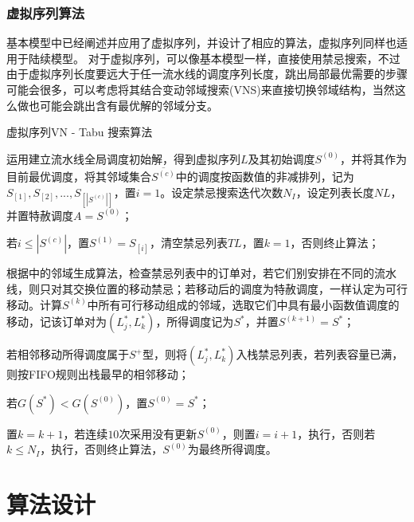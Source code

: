 \subsubsection{虚拟序列算法}
基本模型中已经阐述并应用了虚拟序列，并设计了相应的算法，虚拟序列同样也适用于陆续模型。
对于虚拟序列，可以像基本模型一样，直接使用禁忌搜索，不过由于虚拟序列长度要远大于任一流水线的调度序列长度，跳出局部最优需要的步骤可能会很多，可以考虑将其结合变动邻域搜索(VNS)来直接切换邻域结构，当然这么做也可能会跳出含有最优解的邻域分支。
\begin{algori}
虚拟序列VN - Tabu 搜索算法
\begin{asparaenum}
\renewcommand{\labelenumi}{\bf Step\theenumi~}
\item 运用建立流水线全局调度初始解，得到虚拟序列$L$及其初始调度$S^{(0)}$，并将其作为目前最优调度，将其邻域集合$\overline{S^{(c)}}$中的调度按函数值的非减排列，记为$S_{[1]},S_{[2]},...,S_{[|S^{(c)}|]}$，置$i = 1$。设定禁忌搜索迭代次数$N_I$，设定列表长度$NL$，并置特赦调度$A = S^{(0)}$；
\item 若$i \le |S^{(c)}|$，置$S^{(1)} = S_{[i]}$，清空禁忌列表$TL$，置$k = 1$，否则终止算法；
\item 根据中的邻域生成算法，检查禁忌列表中的订单对，若它们别安排在不同的流水线，则只对其交换位置的移动禁忌；若移动后的调度为特赦调度，一样认定为可行移动。计算$S^{(k)}$中所有可行移动组成的邻域，选取它们中具有最小函数值调度的移动，记该订单对为$(L_j^*, L_k^*)$，所得调度记为$S^*$，并置$S^{(k+1)} = S^*$；
\item 若相邻移动所得调度属于$S^+$型，则将$(L_j^*, L_k^*)$入栈禁忌列表，若列表容量已满，则按FIFO规则出栈最早的相邻移动；
\item 若$G(S^*) < G(S^{(0)})$，置$S^{(0)} = S^*$；
\item 置$k = k + 1$，若连续$10$次采用没有更新$S^{(0)}$，则置$i = i+1$，执行，否则若$k\le N_I$，执行，否则终止算法，$S^{(0)}$为最终所得调度。
\end{asparaenum}
\end{algori}
\section{算法设计}
